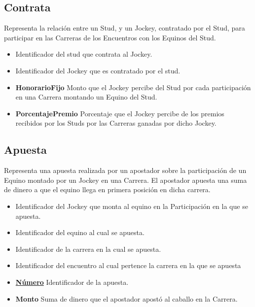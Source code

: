 \documentclass[a4paper,11pt]{article}
\begin{document}
\subsection{Contrata}

Representa la relación entre un Stud, y un Jockey, contratado por el Stud, para
participar en las Carreras de los Encuentros con los Equinos del Stud.

\begin{itemize}

  \item \textbf{\uline{}} Identificador del stud que contrata
    al Jockey.

  \item \textbf{\uline{}} Identificador del Jockey que es
    contratado por el stud.

  \item \textbf{HonorarioFijo} Monto que el Jockey percibe del Stud por cada
    participación en una Carrera montando un Equino del Stud.
  
  \item \textbf{PorcentajePremio} Porcentaje que el Jockey percibe de los premios
    recibidos por los Studs por las Carreras ganadas por dicho Jockey.
    
\end{itemize}

\subsection{Apuesta}

Representa una apuesta realizada por un apostador sobre la participación de un Equino
montado por un Jockey en una Carrera. El apostador apuesta una suma de dinero a que
el equino llega en primera posición en dicha carrera.

\begin{itemize}

  \item \textbf{\uline{}} Identificador del Jockey que monta
    al equino en la Participación en la que se apuesta.

  \item \textbf{\uline{}} Identificador del equino al cual
    se apuesta.
  
  \item \textbf{\uline{}} Identificador de la carrera en la 
    cual se apuesta.
  
  \item \textbf{\uline{}} Identificador del encuentro
    al cual pertence la carrera en la que se apuesta

  \item \textbf{\uline{Número}} Identificador de la apuesta.

  \item \textbf{Monto} Suma de dinero que el apostador apostó al caballo en la
    Carrera.

\end{itemize}
\end{document}
